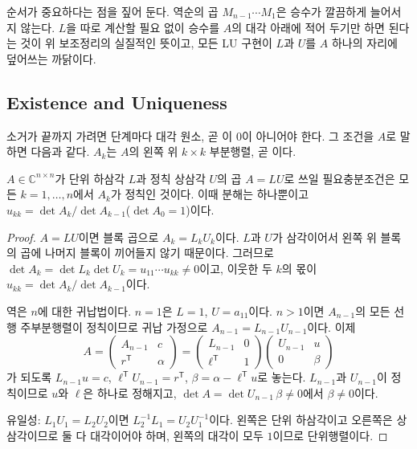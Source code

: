 순서가 중요하다는 점을 짚어 둔다. 역순의 곱 $M_{n-1}\cdots M_1$은 승수가 깔끔하게 늘어서지 않는다. $L$을 따로 계산할 필요 없이 승수를 $A$의 대각 아래에 적어 두기만 하면 된다는 것이 위 보조정리의 실질적인 뜻이고, 모든 LU 구현이 $L$과 $U$를 $A$ 하나의 자리에 덮어쓰는 까닭이다.

\subsection{Existence and Uniqueness}

소거가 끝까지 가려면 단계마다 대각 원소, 곧 이 $0$이 아니어야 한다. 그 조건을 $A$로 말하면 다음과 같다. $A_k$는 $A$의 왼쪽 위 $k\times k$ 부분행렬, 곧 이다.

\begin{theorem}
\label{thm:lu-existence}
$A\in\mathbb C^{n\times n}$가 단위 하삼각 $L$과 정칙 상삼각 $U$의 곱 $A=LU$로 쓰일 필요충분조건은 모든 $k=1,\dots,n$에서 $A_k$가 정칙인 것이다. 이때 분해는 하나뿐이고 $u_{kk}=\det A_k/\det A_{k-1}$($\det A_0=1$)이다.
\end{theorem}

\begin{proof}
$A=LU$이면 블록 곱으로 $A_k=L_kU_k$이다. $L$과 $U$가 삼각이어서 왼쪽 위 블록의 곱에 나머지 블록이 끼어들지 않기 때문이다. 그러므로 $\det A_k=\det L_k\det U_k=u_{11}\cdots u_{kk}\ne0$이고, 이웃한 두 $k$의 몫이 $u_{kk}=\det A_k/\det A_{k-1}$이다.

역은 $n$에 대한 귀납법이다. $n=1$은 $L=1$, $U=a_{11}$이다. $n>1$이면 $A_{n-1}$의 모든 선행 주부분행렬이 정칙이므로 귀납 가정으로 $A_{n-1}=L_{n-1}U_{n-1}$이다. 이제
\[
A=\begin{pmatrix}A_{n-1}&c\\r^{\mathsf T}&\alpha\end{pmatrix}
=\begin{pmatrix}L_{n-1}&0\\ \ell^{\mathsf T}&1\end{pmatrix}
\begin{pmatrix}U_{n-1}&u\\0&\beta\end{pmatrix}
\]
가 되도록 $L_{n-1}u=c$, $\ell^{\mathsf T}U_{n-1}=r^{\mathsf T}$, $\beta=\alpha-\ell^{\mathsf T}u$로 놓는다. $L_{n-1}$과 $U_{n-1}$이 정칙이므로 $u$와 $\ell$은 하나로 정해지고, $\det A=\det U_{n-1}\,\beta\ne0$에서 $\beta\ne0$이다.

유일성: $L_1U_1=L_2U_2$이면 $L_2^{-1}L_1=U_2U_1^{-1}$이다. 왼쪽은 단위 하삼각이고 오른쪽은 상삼각이므로 둘 다 대각이어야 하며, 왼쪽의 대각이 모두 $1$이므로 단위행렬이다.
\end{proof}

